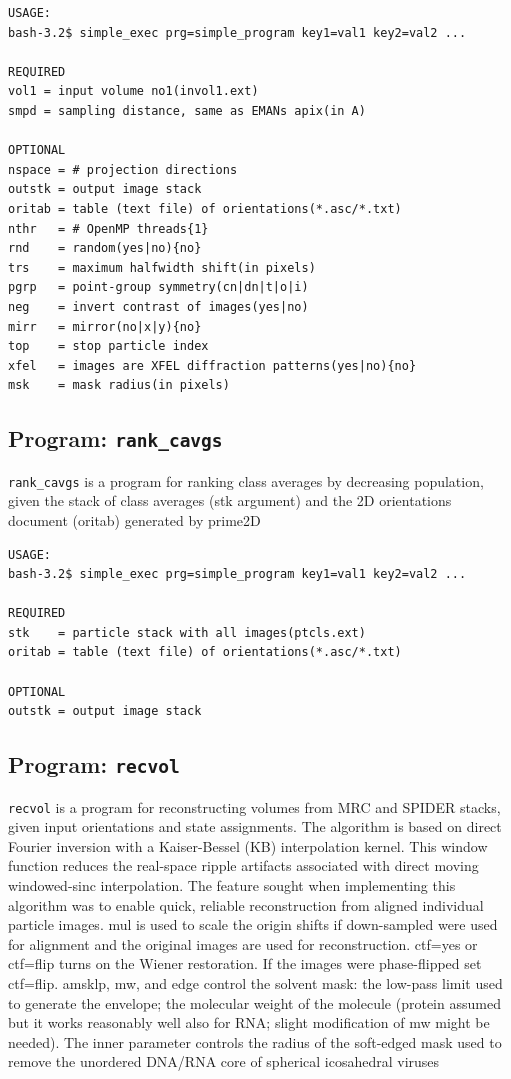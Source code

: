\documentclass[a4paper,11pt]{article}
\newcommand{\prgname}[1]{\textcolor{NavyBlue}{\texttt{#1}}}
\begin{document}
\begin{verbatim}
USAGE:
bash-3.2$ simple_exec prg=simple_program key1=val1 key2=val2 ...

REQUIRED
vol1 = input volume no1(invol1.ext)
smpd = sampling distance, same as EMANs apix(in A)

OPTIONAL
nspace = # projection directions
outstk = output image stack
oritab = table (text file) of orientations(*.asc/*.txt)
nthr   = # OpenMP threads{1}
rnd    = random(yes|no){no}
trs    = maximum halfwidth shift(in pixels)
pgrp   = point-group symmetry(cn|dn|t|o|i)
neg    = invert contrast of images(yes|no)
mirr   = mirror(no|x|y){no}
top    = stop particle index
xfel   = images are XFEL diffraction patterns(yes|no){no}
msk    = mask radius(in pixels)
\end{verbatim}

\subsection{Program: \prgname{rank\_cavgs}}
\label{rank_cavgs}
\prgname{rank\_cavgs} is a program for ranking class averages by decreasing population, given the stack of class averages (stk argument) and the 2D orientations document (oritab) generated by prime2D

\begin{verbatim}
USAGE:
bash-3.2$ simple_exec prg=simple_program key1=val1 key2=val2 ...

REQUIRED
stk    = particle stack with all images(ptcls.ext)
oritab = table (text file) of orientations(*.asc/*.txt)

OPTIONAL
outstk = output image stack
\end{verbatim}

\subsection{Program: \prgname{recvol}}
\label{recvol}
\prgname{recvol} is a program for reconstructing volumes from MRC and SPIDER stacks, given input orientations and state assignments. The algorithm is based on direct Fourier inversion with a Kaiser-Bessel (KB) interpolation kernel. This window function reduces the real-space ripple artifacts associated with direct moving windowed-sinc interpolation. The feature sought when implementing this algorithm was to enable quick, reliable reconstruction from aligned individual particle images. mul is used to scale the origin shifts if down-sampled were used for alignment and the original images are used for reconstruction. ctf=yes or ctf=flip turns on the Wiener restoration. If the images were phase-flipped set ctf=flip. amsklp, mw, and edge control the solvent mask: the low-pass limit used to generate the envelope; the molecular weight of the molecule (protein assumed but it works reasonably well also for RNA; slight modification of mw might be needed). The inner parameter controls the radius of the soft-edged mask used to remove the unordered DNA/RNA core of spherical icosahedral viruses
\end{document}
